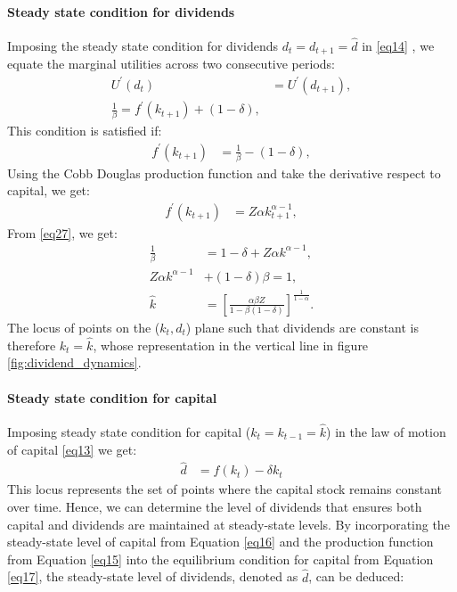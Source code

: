 \documentclass[12pt]{report}
\begin{document}
\paragraph{Steady state condition for dividends}
Imposing the steady state condition for dividends \( d_t = d_{t+1} = \widehat{d} \) in \ref{eq14} , we
equate the marginal  utilities across two consecutive periods:
\begin{align}
    U^{\prime}(d_t) &= U^{\prime}(d_{t+1}), \nonumber \\
    \frac{1}{\beta} = f^{\prime}(k_{t+1}) + (1-\delta),\label{eq27}
\end{align}
This condition is satisfied if:
\begin{align}
    f^{\prime}(k_{t+1}) &= \frac{1}{\beta} - (1-\delta), 
\end{align}
Using the Cobb Douglas production function and take the derivative respect to capital, we get:
\begin{align}
    f^{\prime}(k_{t+1}) &= Z \alpha k^{\alpha-1}_{t+1},  \label{eq15'}
\end{align}
From \ref{eq27}, we get: 
\begin{align}
    \frac{1}{\beta}&=1-\delta+Z\alpha k^{\alpha-1},\nonumber \\
    Z\alpha k^{\alpha-1} &+(1-\delta)\beta=1, \nonumber \\
    \widehat{k} &= \left[\frac{\alpha \beta Z}{1 - \beta\left(1-\delta\right)}\right]^{\frac{1}{1-\alpha}}.  \label{eq16}
\end{align}
The locus of points on the (\(k_t,d_t\)) plane such that dividends are constant is therefore
\(k_t=\hat{k}\), whose representation in the vertical line in figure \ref{fig:dividend_dynamics}.
\paragraph{Steady state condition for capital}
Imposing steady state condition for capital (\(k_t = k_{t-1} = \widehat{k}\)) in the law of motion of capital \ref{eq13} we
get:
\begin{align}
    \widehat{d} & = f(k_t) - \delta k_t  \label{eq17}
\end{align}
This locus represents the set of points where the capital stock remains constant over time. Hence, we can determine the
level of dividends that ensures both capital and dividends are maintained at steady-state levels. By incorporating the
steady-state level of capital  from Equation \ref{eq16} and the production function from Equation \ref{eq15} into the equilibrium
condition for capital from Equation \ref{eq17}, the steady-state level of dividends, denoted as \( \widehat{d} \), can be
deduced:
\end{document}
